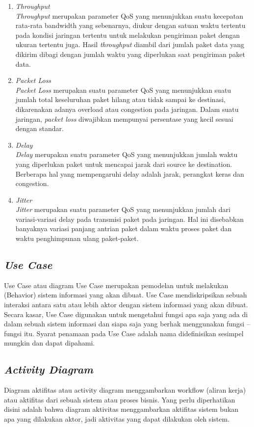 \begin{enumerate}
	\item \textit{\textit{Throughput}} \\
	\textit{Throughput} merupakan parameter QoS yang 
menunjukkan suatu kecepatan rata-rata bandwidth
yang sebenarnya, diukur dengan satuan waktu 
tertentu pada kondisi jaringan tertentu untuk 
melakukan pengiriman paket dengan ukuran tertentu 
juga. Hasil \textit{throughput} diambil dari jumlah paket 
data yang dikirim dibagi dengan jumlah waktu yang 
diperlukan saat pengiriman paket data.
	\item \textit{Packet Loss} \\
	\textit{Packet Loss} merupakan suatu parameter QoS 
yang menunjukkan suatu jumlah total keseluruhan 
paket hilang atau tidak sampai ke destinasi, 
dikarenakan adanya overload atau congestion pada 
jaringan. Dalam suatu jaringan, \textit{packet loss}
diwajibkan mempunyai persentase yang kecil sesuai 
dengan standar. 
\item \textit{Delay} \\
\textit{Delay} merupakan suatu parameter QoS yang 
menunjukkan jumlah waktu yang diperlukan paket 
untuk mencapai jarak dari source ke destination. 
Berberapa hal yang mempengaruhi delay adalah 
jarak, perangkat keras dan congestion. 
\item \textit{Jitter}\\
\textit{Jitter} merupakan suatu parameter QoS yang 
menunjukkan jumlah dari variasi-variasi delay pada 
transmisi paket pada jaringan. Hal ini disebabkan 
banyaknya variasi panjang antrian paket dalam 
waktu proses paket dan waktu penghimpunan ulang 
paket-paket.

\end{enumerate}

\subsection{\textit{Use Case}}
\noindent

Use Case atau diagram Use Case merupakan 
pemodelan untuk melakukan (Behavior) sistem 
informasi yang akan dibuat. Use Case
mendiskripsikan sebuah interaksi antara satu 
atau lebih aktor dengan sistem informasi yang 
akan dibuat. Secara kasar, Use Case digunakan 
untuk mengetahui fungsi apa saja yang ada di 
dalam sebuah sistem informasi dan siapa saja 
yang berhak menggunakan fungsi – fungsi itu. 
Syarat penamaan pada Use Case adalah nama 
didefinisikan sesimpel mungkin dan dapat 
dipahami\cite{mandiri2013pembuatan}. 

\subsection{\textit{Activity Diagram}}
\noindent

Diagram aktifitas atau activity diagram
menggambarkan workflow (aliran kerja) atau 
aktifitas dari sebuah sistem atau proses bisnis. 
Yang perlu diperhatikan disini adalah bahwa 
diagram aktivitas menggambarkan aktifitas 
sistem bukan apa yang dilakukan aktor, jadi 
aktivitas yang dapat dilakukan oleh sistem\cite{mandiri2013pembuatan}.





